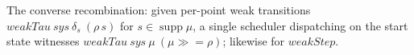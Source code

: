 \begin{lemma}
  \label{lem:mix}
  \leanok
  The converse recombination: given per-point weak transitions
  $weakTau\ sys\ \delta_s\ (\rho\,s)$ for $s \in \operatorname{supp}\mu$, a single
  scheduler dispatching on the start state witnesses
  $weakTau\ sys\ \mu\ (\mu \mathbin{\gg\!=} \rho)$; likewise for $weakStep$.
\end{lemma}
